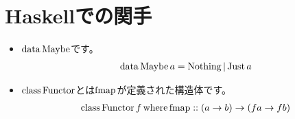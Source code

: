 {\section{Haskellでの関手}\label{s1:Haskellでの関手} %
	\begin{itemize}\setlength{\itemsep}{-1mm} %
		\item $\op{data}\op{Maybe}$です。
		\begin{equation*}\begin{split}
			\op{data}\op{Maybe} a = \op{Nothing} | \op{Just} a
		\end{split}\end{equation*}
		\item $\op{class}\op{Functor}$とは$\op{fmap}$が定義された構造体です。
		\begin{equation*}\begin{split}
			\op{class}\op{Functor} f \op{where} \op{fmap}:: (a\to b)\to (fa\to fb)
		\end{split}\end{equation*}
	\end{itemize} %
}
